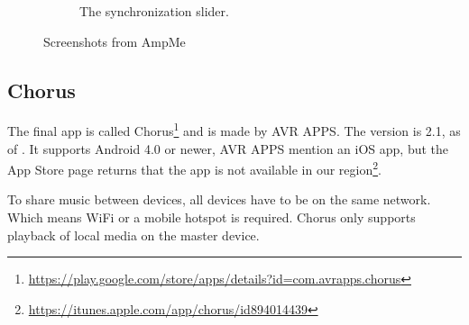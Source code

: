 \begin{figure}[h!]
\begin{subfigure}[b]{0.45\textwidth}
        \caption{The synchronization slider.}\label{fig:ampme_slider}
    \end{subfigure}
    \caption{Screenshots from AmpMe}\label{fig:ampme_screenshots}
\end{figure}

\subsection{Chorus}\label{subsec:chorus}
The final app is called Chorus\footnote{\url{https://play.google.com/store/apps/details?id=com.avrapps.chorus}} and is made by AVR APPS.
The version is 2.1, as of .
It supports Android 4.0 or newer, AVR APPS mention an iOS app, but the App Store page returns that the app is not available in our region\footnote{\url{https://itunes.apple.com/app/chorus/id894014439}}.

To share music between devices, all devices have to be on the same network.
Which means WiFi or a mobile hotspot is required.
Chorus only supports playback of local media on the master device.

